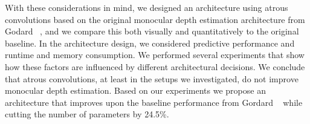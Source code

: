 With these considerations in mind, we designed an architecture using atrous convolutions based on the original monocular depth estimation architecture from Godard \etal~\cite{Godard_2017_CVPR}, and we compare this both visually and quantitatively to the original baseline. In the architecture design, we considered predictive performance and runtime and memory consumption.
We performed several experiments that show how these factors are influenced by different architectural decisions.
We conclude that atrous convolutions, at least in the setups we investigated, do not improve monocular depth estimation. 
Based on our experiments we propose an architecture that improves upon the baseline performance from Gordard \etal~\cite{Godard_2017_CVPR} while cutting the number of parameters by 24.5\%. 

